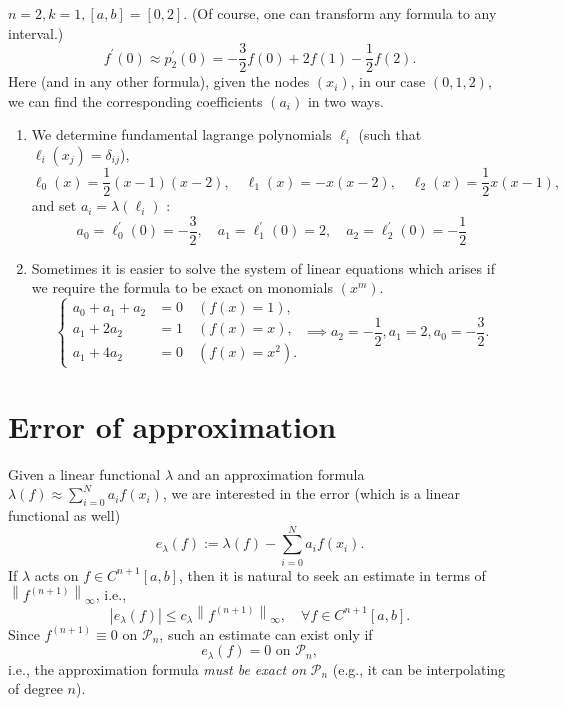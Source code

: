 \documentclass[a4paper]{article}
\begin{document}
\begin{example}
    $n=2, k=1,[a, b]=[0,2]$. (Of course, one can transform any formula to any interval.)
\begin{equation}\label{eqn:4.4}
    f^{\prime}(0) \approx p_2^{\prime}(0)=-\frac{3}{2} f(0)+2 f(1)-\frac{1}{2} f(2) .
\end{equation}
Here (and in any other formula), given the nodes $\left(x_i\right)$, in our case $(0,1,2)$, we can find the corresponding coefficients $\left(a_i\right)$ in two ways.
\begin{enumerate}
    \item We determine fundamental lagrange polynomials $\ell_i$ (such that $\ell_i\left(x_j\right)=\delta_{i j}$),
    \[
    \ell_0(x)=\frac{1}{2}(x-1)(x-2), \quad \ell_1(x)=-x(x-2), \quad \ell_2(x)=\frac{1}{2} x(x-1),
    \]
    and set $a_i=\lambda\left(\ell_i\right)$ :
    \[
    a_0=\ell_0^{\prime}(0)=-\frac{3}{2}, \quad a_1=\ell_1^{\prime}(0)=2, \quad a_2=\ell_2^{\prime}(0)=-\frac{1}{2}
    \]
    \item Sometimes it is easier to solve the system of linear equations which arises if we require the formula to be exact on monomials $\left(x^m\right)$.
    \[
        \left\{ \begin{aligned}
             a_0+a_1+a_2 &= 0\quad (f(x)=1),\\ 
             a_1+2a_2&=1 \quad (f(x)=x),\\ 
             a_1+4a_2 &= 0\quad (f(x) = x^2).
        \end{aligned}  \right. \implies a_2=-\frac{1}{2},a_1=2,a_0=-\frac{3}{2}. 
    \]
\end{enumerate}
\end{example}

\section{Error of approximation}
Given a linear functional $\lambda$ and an approximation formula $\lambda(f) \approx \sum_{i=0}^N a_i f\left(x_i\right)$, we are interested in the error (which is a linear functional as well)
\[
e_\lambda(f):=\lambda(f)-\sum_{i=0}^N a_i f\left(x_i\right) .
\]
If $\lambda$ acts on $f \in C^{n+1}[a, b]$, then it is natural to seek an estimate in terms of $\left\|f^{(n+1)}\right\|_{\infty}$, i.e.,
\begin{equation}\label{eqn:5.1}
    \left|e_\lambda(f)\right| \leq c_\lambda\left\|f^{(n+1)}\right\|_{\infty}, \quad \forall f \in C^{n+1}[a, b] .
\end{equation}
Since $f^{(n+1)} \equiv 0$ on $\mathcal{P}_n$, such an estimate can exist only if
\[
e_\lambda(f)=0 \text { on } \mathcal{P}_n,
\]
i.e., the approximation formula \textit{must be exact on} $\mathcal{P}_n$ (e.g., it can be interpolating of degree $n$). 
\end{document}
